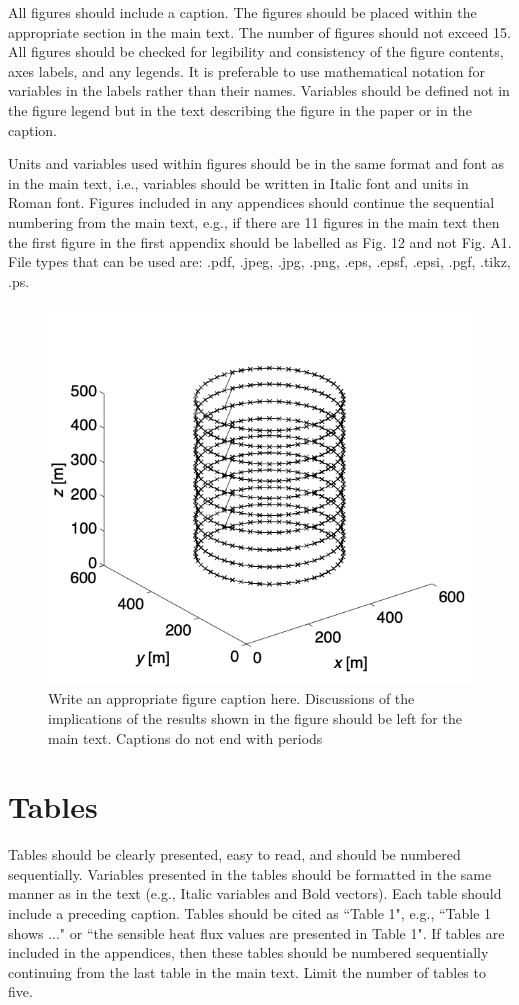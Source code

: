 All figures should include a caption. The figures should be placed within the appropriate section in the main text. The number of figures should not exceed 15. All figures should be checked for legibility and consistency of the figure contents, axes labels, and any legends. It is preferable to use mathematical notation for variables in the labels rather than their names. Variables should be defined not in the figure legend but in the text describing the figure in the paper or in the caption. 

Units and variables used within figures should be in the same format and font as in the main text, i.e., variables should be written in Italic font and units in Roman font. Figures included in any appendices should continue the sequential numbering from the main text, e.g., if there are 11 figures in the main text then the first figure in the first appendix should be labelled as Fig. 12 and not Fig. A1. File types that can be used are: .pdf, .jpeg, .jpg, .png, .eps, .epsf, .epsi, .pgf, .tikz, .ps.

\begin{figure}
\centering
  \includegraphics{Fig1.png}
\caption{Write an appropriate figure caption here. Discussions of the implications of the results shown in the figure should be left for the main text. Captions do not end with periods}
\label{fig1}     
\end{figure}


\section{Tables}
Tables should be clearly presented, easy to read, and should be numbered sequentially. Variables presented in the tables should be formatted in the same manner as in the text (e.g., Italic variables and Bold vectors). Each table should include a preceding caption. Tables should be cited as ``Table 1", e.g., ``Table 1 shows ..." or ``the sensible heat flux values are presented in Table 1". If tables are included in the appendices, then these tables should be numbered sequentially continuing from the last table in the main text. Limit the number of tables to five.

